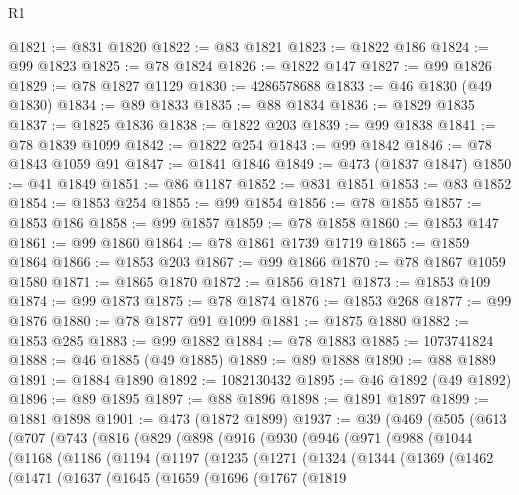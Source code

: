 \begin{lexlean}{R1}
\begin{coremodule}
@1821 := @831 @1820
@1822 := @83 @1821
@1823 := @1822 @186
@1824 := @99 @1823
@1825 := @78 @1824
@1826 := @1822 @147
@1827 := @99 @1826
@1829 := @78 @1827 @1129
@1830 := 4286578688
@1833 := @46 @1830 (@49 @1830)
@1834 := @89 @1833
@1835 := @88 @1834
@1836 := @1829 @1835
@1837 := @1825 @1836
@1838 := @1822 @203
@1839 := @99 @1838
@1841 := @78 @1839 @1099
@1842 := @1822 @254
@1843 := @99 @1842
@1846 := @78 @1843 @1059 @91
@1847 := @1841 @1846
@1849 := @473 (@1837 @1847)
@1850 := @41 @1849
@1851 := @86 @1187
@1852 := @831 @1851
@1853 := @83 @1852
@1854 := @1853 @254
@1855 := @99 @1854
@1856 := @78 @1855
@1857 := @1853 @186
@1858 := @99 @1857
@1859 := @78 @1858
@1860 := @1853 @147
@1861 := @99 @1860
@1864 := @78 @1861 @1739 @1719
@1865 := @1859 @1864
@1866 := @1853 @203
@1867 := @99 @1866
@1870 := @78 @1867 @1059 @1580
@1871 := @1865 @1870
@1872 := @1856 @1871
@1873 := @1853 @109
@1874 := @99 @1873
@1875 := @78 @1874
@1876 := @1853 @268
@1877 := @99 @1876
@1880 := @78 @1877 @91 @1099
@1881 := @1875 @1880
@1882 := @1853 @285
@1883 := @99 @1882
@1884 := @78 @1883
@1885 := 1073741824
@1888 := @46 @1885 (@49 @1885)
@1889 := @89 @1888
@1890 := @88 @1889
@1891 := @1884 @1890
@1892 := 1082130432
@1895 := @46 @1892 (@49 @1892)
@1896 := @89 @1895
@1897 := @88 @1896
@1898 := @1891 @1897
@1899 := @1881 @1898
@1901 := @473 (@1872 @1899)
@1937 := @39
    (@469
      (@505
        (@613
          (@707
            (@743
              (@816
                (@829
                  (@898
                    (@916
                      (@930
                        (@946
                          (@971
                            (@988
                              (@1044
                                (@1168
                                  (@1186
                                    (@1194
                                      (@1197
                                        (@1235
                                          (@1271
                                            (@1324
                                              (@1344
                                                (@1369
                                                  (@1462
                                                    (@1471
                                                      (@1637
                                                        (@1645
                                                          (@1659
                                                            (@1696
                                                              (@1767
                                                                (@1819

\end{coremodule}
\end{lexlean}
